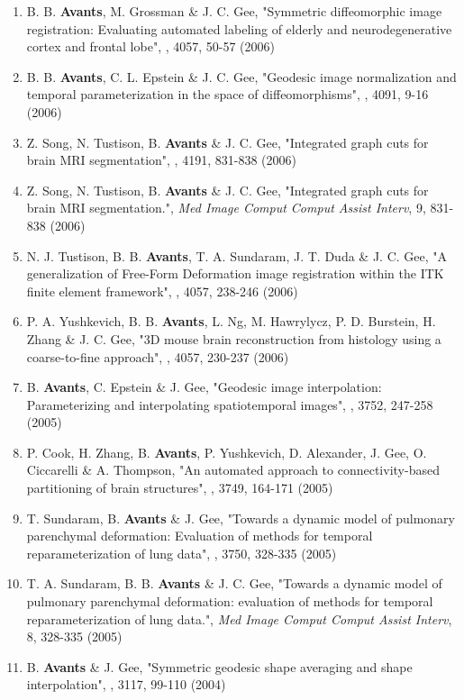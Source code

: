 \documentclass[11pt]{moderncv} %
\begin{document}
\begin{enumerate}
{\em Med Image Comput Comput Assist Interv}, 10, 303-310 (2007)
\item B. B. \textbf{Avants}, M. Grossman \&  J. C. Gee, 
"Symmetric diffeomorphic image registration: Evaluating automated labeling of elderly and neurodegenerative cortex and frontal lobe", 
, 4057, 50-57 (2006)
\item B. B. \textbf{Avants}, C. L. Epstein \&  J. C. Gee, 
"Geodesic image normalization and temporal parameterization in the space of diffeomorphisms", 
, 4091, 9-16 (2006)
\item Z. Song, N. Tustison, B. \textbf{Avants} \&  J. C. Gee, 
"Integrated graph cuts for brain MRI segmentation", 
, 4191, 831-838 (2006)
\item Z. Song, N. Tustison, B. \textbf{Avants} \&  J. C. Gee, 
"Integrated graph cuts for brain MRI segmentation.", 
{\em Med Image Comput Comput Assist Interv}, 9, 831-838 (2006)
\item N. J. Tustison, B. B. \textbf{Avants}, T. A. Sundaram, J. T. Duda \&  J. C. Gee, 
"A generalization of Free-Form Deformation image registration within the ITK finite element framework", 
, 4057, 238-246 (2006)
\item P. A. Yushkevich, B. B. \textbf{Avants}, L. Ng, M. Hawrylycz, P. D. Burstein, H. Zhang \&  J. C. Gee, 
"3D mouse brain reconstruction from histology using a coarse-to-fine approach", 
, 4057, 230-237 (2006)
\item B. \textbf{Avants}, C. Epstein \&  J. Gee, 
"Geodesic image interpolation: Parameterizing and interpolating spatiotemporal images", 
, 3752, 247-258 (2005)
\item P. Cook, H. Zhang, B. \textbf{Avants}, P. Yushkevich, D. Alexander, J. Gee, O. Ciccarelli \&  A. Thompson, 
"An automated approach to connectivity-based partitioning of brain structures", 
, 3749, 164-171 (2005)
\item T. Sundaram, B. \textbf{Avants} \&  J. Gee, 
"Towards a dynamic model of pulmonary parenchymal deformation: Evaluation of methods for temporal reparameterization of lung data", 
, 3750, 328-335 (2005)
\item T. A. Sundaram, B. B. \textbf{Avants} \&  J. C. Gee, 
"Towards a dynamic model of pulmonary parenchymal deformation: evaluation of methods for temporal reparameterization of lung data.", 
{\em Med Image Comput Comput Assist Interv}, 8, 328-335 (2005)
\item B. \textbf{Avants} \&  J. Gee, 
"Symmetric geodesic shape averaging and shape interpolation", 
, 3117, 99-110 (2004)

\end{enumerate}
\end{document}
